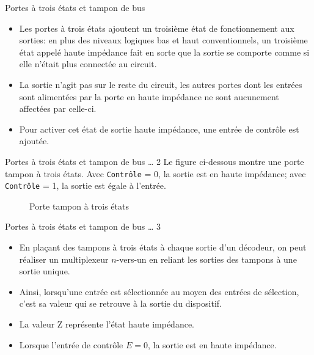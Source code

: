 \documentclass[presentation]{beamer}
\begin{document}
\begin{frame}[label={sec:orgd31e130}]{Portes à trois états et tampon de bus}
\begin{itemize}
\item Les portes à trois états ajoutent un troisième état de fonctionnement aux sorties: en plus des niveaux logiques bas et haut conventionnels, un troisième état appelé \alert{haute impédance} fait en sorte que la sortie se comporte comme si elle n'était plus connectée au circuit.

\item La sortie n'agit pas sur le reste du circuit, les autres portes dont les entrées sont alimentées par la porte en haute impédance ne sont aucunement affectées par celle-ci.

\item Pour activer cet état de sortie haute impédance, une entrée de contrôle est ajoutée.
\end{itemize}
\end{frame}

\begin{frame}[label={sec:org34c3bd9},fragile]{Portes à trois états et tampon de bus \ldots{} 2}
 Le figure ci-dessous montre une porte tampon à trois états. Avec
\texttt{Contrôle} = 0, la sortie est en haute impédance; avec  \texttt{Contrôle} = 1,
la sortie est égale à l'entrée.

\begin{figure}[htbp]
\centering

\caption{\label{fig:org452d03f}Porte tampon à trois états}
\end{figure}
\end{frame}

\begin{frame}[label={sec:org3da19b9}]{Portes à trois états et tampon de bus \ldots{} 3}
\begin{itemize}
\item En plaçant des tampons à trois états à chaque sortie d'un décodeur, on peut réaliser un multiplexeur \(n\)-vers-un en reliant les sorties des tampons à une sortie unique.

\item Ainsi, lorsqu'une entrée est sélectionnée au moyen des entrées de sélection, c'est sa valeur qui se retrouve à la sortie du dispositif.

\item La valeur Z représente l'état haute impédance.

\item Lorsque l'entrée de contrôle \(E = 0\), la sortie est en haute impédance.
\end{itemize}
\end{frame}
\end{document}
